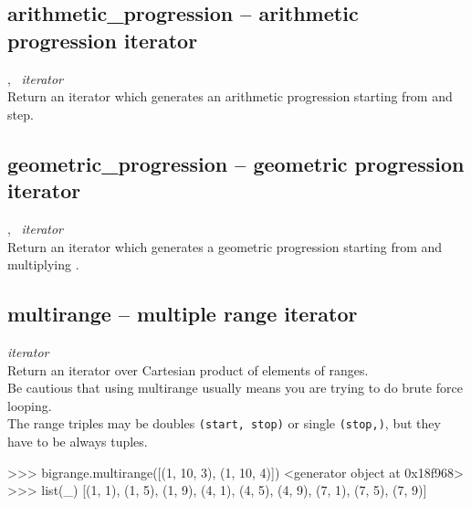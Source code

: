   \subsection{arithmetic\_progression -- arithmetic progression iterator}
   {%
     ,\ %
   }{%
     {\em iterator}
   }\\
   \spacing
   \quad Return an iterator which generates an arithmetic progression
   starting from  and  step.\\

  \subsection{geometric\_progression -- geometric progression iterator}
   {%
     ,\ %
   }{%
     {\em iterator}
   }\\
   \spacing
   \quad Return an iterator which generates a geometric progression
   starting from  and multiplying .\\

  \subsection{multirange -- multiple range iterator}
   {%
   }{%
     {\em iterator}
   }\\
   \spacing
   \quad Return an iterator over Cartesian product of elements of ranges.\\
   \spacing
   \quad Be cautious that using multirange usually means you are
   trying to do brute force looping.\\
   \spacing
   \quad The range triples may be doubles {\tt (start, stop)} or single {\tt (stop,)},
   but they have to be always tuples.\\
   
%
\begin{ex}
>>> bigrange.multirange([(1, 10, 3), (1, 10, 4)])
<generator object at 0x18f968>
>>> list(_)
[(1, 1), (1, 5), (1, 9), (4, 1), (4, 5), (4, 9), (7, 1),
 (7, 5), (7, 9)]
\end{ex}%

